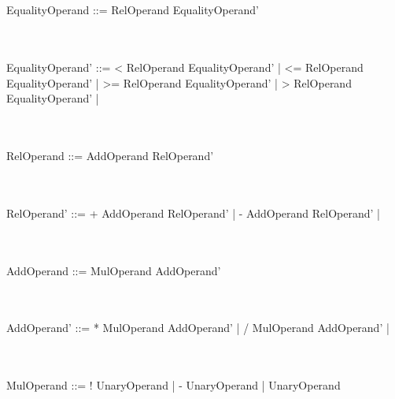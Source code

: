 \documentclass[a4paper,portrait,12pt]{article}
\begin{document}
\\~\\
EqualityOperand ::=	RelOperand EqualityOperand'

\\~\\
EqualityOperand' ::=	< RelOperand EqualityOperand'	\newline
\hspace*{.625in} | <= RelOperand EqualityOperand'		\newline
\hspace*{.625in} | >= RelOperand EqualityOperand'		\newline
\hspace*{.625in} | > RelOperand	EqualityOperand'		\newline
\hspace*{.625in} | \epsilon

\\~\\
RelOperand ::=	AddOperand RelOperand'			\newline

\\~\\
RelOperand' ::=	+ AddOperand RelOperand'		\newline
\hspace*{.625in} | - AddOperand	RelOperand' 	\newline
\hspace*{.625in} | \epsilon

\\~\\
AddOperand ::=	MulOperand AddOperand'			\newline

\\~\\
AddOperand' ::=	* MulOperand AddOperand'		\newline
\hspace*{.625in} | / MulOperand	AddOperand' 	\newline
\hspace*{.625in} | \epsilon

\\~\\
MulOperand ::=	! UnaryOperand				\newline
\hspace*{.625in} | - UnaryOperand			\newline
\hspace*{.625in} | UnaryOperand				\newline
\end{document}
